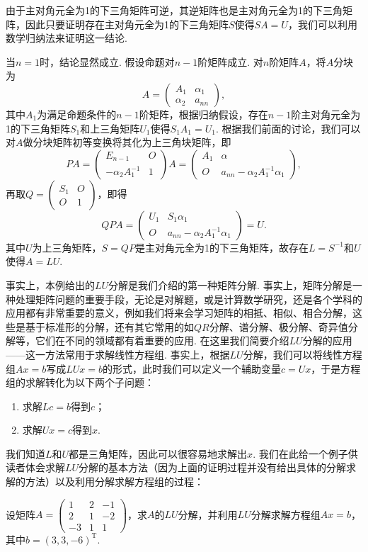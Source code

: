\begin{solution}
    由于主对角元全为1的下三角矩阵可逆，其逆矩阵也是主对角元全为1的下三角矩阵，因此只要证明存在主对角元全为1的下三角矩阵$S$使得$SA=U$，我们可以利用数学归纳法来证明这一结论.

    当$n=1$时，结论显然成立. 假设命题对$n-1$阶矩阵成立. 对$n$阶矩阵$A$，将$A$分块为
    \[A=\begin{pmatrix}
            A_1 & \alpha_1 \\ \alpha_2 & a_{nn}
        \end{pmatrix},\]
    其中$A_1$为满足命题条件的$n-1$阶矩阵，根据归纳假设，存在$n-1$阶主对角元全为1的下三角矩阵$S_1$和上三角矩阵$U_1$使得$S_1A_1=U_1$. 根据我们前面的讨论，我们可以对$A$做分块矩阵初等变换将其化为上三角块矩阵，即
    \[PA=\begin{pmatrix}
            E_{n-1} & O \\ -\alpha_2A_1^{-1} & 1
        \end{pmatrix}A=\begin{pmatrix}
            A_1 & \alpha \\ O & a_{nn}-\alpha_2A_1^{-1}\alpha_1
        \end{pmatrix},\]
    再取$Q=\begin{pmatrix}
            S_1 & O \\ O & 1
        \end{pmatrix}$，即得
    \[QPA=\begin{pmatrix}
            U_1 & S_1\alpha_1 \\ O & a_{nn}-\alpha_2A_1^{-1}\alpha_1
        \end{pmatrix}=U.\]
    其中$U$为上三角矩阵，$S=QP$是主对角元全为1的下三角矩阵，故存在$L=S^{-1}$和$U$使得$A=LU$.
\end{solution}

事实上，本例给出的$LU$分解是我们介绍的第一种矩阵分解. 事实上，矩阵分解是一种处理矩阵问题的重要手段，无论是对解题，或是计算数学研究，还是各个学科的应用都有非常重要的意义，例如我们将来会学习矩阵的相抵、相似、相合分解，这些是基于标准形的分解，还有其它常用的如$QR$分解、谱分解、极分解、奇异值分解等，它们在不同的领域都有着重要的应用. 在这里我们简要介绍$LU$分解的应用——这一方法常用于求解线性方程组. 事实上，根据$LU$分解，我们可以将线性方程组$Ax=b$写成$LUx=b$的形式，此时我们可以定义一个辅助变量$c=Ux$，于是方程组的求解转化为以下两个子问题：
\begin{enumerate}
    \item 求解$Lc=b$得到$c$；
    \item 求解$Ux=c$得到$x$.
\end{enumerate}
我们知道$L$和$U$都是三角矩阵，因此可以很容易地求解出$x$. 我们在此给一个例子供读者体会求解$LU$分解的基本方法（因为上面的证明过程并没有给出具体的分解求解的方法）以及利用分解求解方程组的过程：
\begin{example}{}{}
    设矩阵$A=\begin{pmatrix}
            1 & 2 & -1 \\ 2 & 1 & -2 \\ -3 & 1 & 1
        \end{pmatrix}$，求$A$的$LU$分解，并利用$LU$分解求解方程组$Ax=b$，其中$b=(3,3,-6)^\mathrm{T}$.
\end{example}

